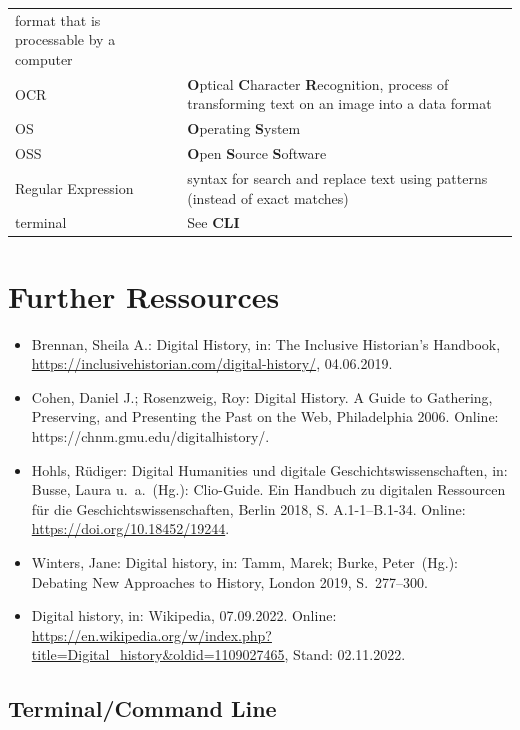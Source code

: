 \documentclass[
  letterpaper,
]{book}
\begin{document}
\begin{longtable}[]{@{}
  >{\raggedright\arraybackslash}p{}
  >{\raggedright\arraybackslash}p{}@{}}
format that is processable by a computer \\
OCR & \textbf{O}ptical \textbf{C}haracter \textbf{R}ecognition, process
of transforming text on an image into a data format \\
OS & \textbf{O}perating \textbf{S}ystem \\
OSS & \textbf{O}pen \textbf{S}ource \textbf{S}oftware \\
Regular Expression & syntax for search and replace text using patterns
(instead of exact matches) \\
terminal & See \textbf{CLI} \\
\bottomrule()
\end{longtable}

\hypertarget{further-ressources}{%
\chapter{Further Ressources}\label{further-ressources}}

\begin{itemize}
\item
  Brennan, Sheila A.: Digital History, in: The Inclusive Historian's
  Handbook, \url{https://inclusivehistorian.com/digital-history/},
  04.06.2019.
\item
  Cohen, Daniel J.; Rosenzweig, Roy: Digital History. A Guide to
  Gathering, Preserving, and Presenting the Past on the Web,
  Philadelphia 2006. Online: https://chnm.gmu.edu/digitalhistory/.
\item
  Hohls, Rüdiger: Digital Humanities und digitale
  Geschichtswissenschaften, in: Busse, Laura u.~a.~(Hg.): Clio-Guide.
  Ein Handbuch zu digitalen Ressourcen für die Geschichtswissenschaften,
  Berlin 2018, S. A.1-1--B.1-34. Online:
  \url{https://doi.org/10.18452/19244}.
\item
  Winters, Jane: Digital history, in: Tamm, Marek; Burke, Peter~(Hg.):
  Debating New Approaches to History, London 2019, S.~277--300.
\item
  Digital history, in: Wikipedia, 07.09.2022. Online:
  \url{https://en.wikipedia.org/w/index.php?title=Digital_history\&oldid=1109027465},
  Stand: 02.11.2022.
\end{itemize}

\hypertarget{terminalcommand-line}{%
\section{Terminal/Command Line}\label{terminalcommand-line}}
\end{document}
